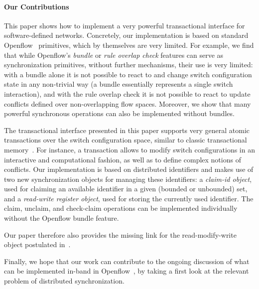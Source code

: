 \documentclass[conference]{sigcomm-alternate}
\begin{document}
\paragraph{Our Contributions}
This paper shows how to implement a very powerful transactional interface
 for software-defined networks. 
 Concretely, our implementation is based on
 standard Openflow~\cite{of-spec} primitives, which by themselves are very limited.
For example, we find that while Openflow's \emph{bundle} or \emph{rule overlap check}
features can serve as synchronization primitives,
without further mechanisms, their use is very limited:
with a bundle alone it is not possible to react to
and change switch configuration state in any non-trivial way (a bundle
essentially represents a single switch interaction),
and with the rule overlap check it is not possible to react to
update conflicts defined over non-overlapping flow spaces.
Moreover, we show that many powerful synchronous operations
can also be implemented without bundles.

The transactional interface presented in this paper supports very general atomic
transactions over the switch configuration space, similar to classic transactional memory~\cite{stm-st95,tm-book}.
For instance, a transaction allows to modify switch configurations in an interactive
and computational fashion, as well as to define complex notions
of conflicts.
Our implementation is based on distributed identifiers and makes use of two
new synchronization objects for managing these identifiers:
a \emph{claim-id object}, used for claiming an available identifier in a given
(bounded or unbounded) set, and a \emph{read-write register object}, used for storing the
currently used identifier.
The claim, unclaim, and check-claim operations can be implemented individually without the Openflow
bundle feature. 

Our paper therefore also provides the missing link for the read-modify-write object
postulated in~\cite{cpc}.


Finally, we hope that our work can contribute to the ongoing discussion of what can be implemented
in-band in Openflow~\cite{compute,reclaim}, by taking a first look
at the relevant problem of distributed
synchronization.
\end{document}
